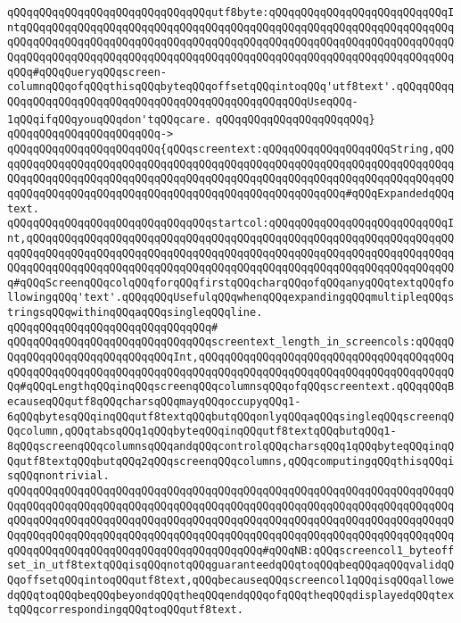 \verb|qQQqqQQqqQQqqQQqqQQqqQQqqQQqqQQqutf8byte:qQQqqQQqqQQqqQQqqQQqqQQqqQQqIntqQQqqQQqqQQqqQQqqQQqqQQqqQQqqQQqqQQqqQQqqQQqqQQqqQQqqQQqqQQqqQQqqQQqqQQqqQQqqQQqqQQqqQQqqQQqqQQqqQQqqQQqqQQqqQQqqQQqqQQqqQQqqQQqqQQqqQQqqQQqqQQqqQQqqQQqqQQqqQQqqQQqqQQqqQQqqQQqqQQqqQQqqQQqqQQqqQQqqQQqqQQqqQQqqQQq#qQQqQueryqQQqscreen-columnqQQqofqQQqthisqQQqbyteqQQqoffsetqQQqintoqQQq'utf8text'.qQQqqQQqqQQqqQQqqQQqqQQqqQQqqQQqqQQqqQQqqQQqqQQqqQQqqQQqUseqQQq-1qQQqifqQQqyouqQQqdon'tqQQqcare.|\newline
\verb|qQQqqQQqqQQqqQQqqQQqqQQq}|\newline
\verb|qQQqqQQqqQQqqQQqqQQqqQQq->|\newline
\verb|qQQqqQQqqQQqqQQqqQQqqQQq{qQQqscreentext:qQQqqQQqqQQqqQQqqQQqString,qQQqqQQqqQQqqQQqqQQqqQQqqQQqqQQqqQQqqQQqqQQqqQQqqQQqqQQqqQQqqQQqqQQqqQQqqQQqqQQqqQQqqQQqqQQqqQQqqQQqqQQqqQQqqQQqqQQqqQQqqQQqqQQqqQQqqQQqqQQqqQQqqQQqqQQqqQQqqQQqqQQqqQQqqQQqqQQqqQQqqQQqqQQqqQQqqQQq#qQQqExpandedqQQqtext.|\newline
\verb|qQQqqQQqqQQqqQQqqQQqqQQqqQQqqQQqstartcol:qQQqqQQqqQQqqQQqqQQqqQQqqQQqInt,qQQqqQQqqQQqqQQqqQQqqQQqqQQqqQQqqQQqqQQqqQQqqQQqqQQqqQQqqQQqqQQqqQQqqQQqqQQqqQQqqQQqqQQqqQQqqQQqqQQqqQQqqQQqqQQqqQQqqQQqqQQqqQQqqQQqqQQqqQQqqQQqqQQqqQQqqQQqqQQqqQQqqQQqqQQqqQQqqQQqqQQqqQQqqQQqqQQqqQQqqQQqqQQq#qQQqScreenqQQqcolqQQqforqQQqfirstqQQqcharqQQqofqQQqanyqQQqtextqQQqfollowingqQQq'text'.qQQqqQQqUsefulqQQqwhenqQQqexpandingqQQqmultipleqQQqstringsqQQqwithinqQQqaqQQqsingleqQQqline.|\newline
\verb|qQQqqQQqqQQqqQQqqQQqqQQqqQQqqQQq#|\newline
\verb|qQQqqQQqqQQqqQQqqQQqqQQqqQQqqQQqscreentext_length_in_screencols:qQQqqQQqqQQqqQQqqQQqqQQqqQQqqQQqInt,qQQqqQQqqQQqqQQqqQQqqQQqqQQqqQQqqQQqqQQqqQQqqQQqqQQqqQQqqQQqqQQqqQQqqQQqqQQqqQQqqQQqqQQqqQQqqQQqqQQqqQQqqQQqqQQq#qQQqLengthqQQqinqQQqscreenqQQqcolumnsqQQqofqQQqscreentext.qQQqqQQqBecauseqQQqutf8qQQqcharsqQQqmayqQQqoccupyqQQq1-6qQQqbytesqQQqinqQQqutf8textqQQqbutqQQqonlyqQQqaqQQqsingleqQQqscreenqQQqcolumn,qQQqtabsqQQq1qQQqbyteqQQqinqQQqutf8textqQQqbutqQQq1-8qQQqscreenqQQqcolumnsqQQqandqQQqcontrolqQQqcharsqQQq1qQQqbyteqQQqinqQQqutf8textqQQqbutqQQq2qQQqscreenqQQqcolumns,qQQqcomputingqQQqthisqQQqisqQQqnontrivial.|\newline
\newline
\verb|qQQqqQQqqQQqqQQqqQQqqQQqqQQqqQQqqQQqqQQqqQQqqQQqqQQqqQQqqQQqqQQqqQQqqQQqqQQqqQQqqQQqqQQqqQQqqQQqqQQqqQQqqQQqqQQqqQQqqQQqqQQqqQQqqQQqqQQqqQQqqQQqqQQqqQQqqQQqqQQqqQQqqQQqqQQqqQQqqQQqqQQqqQQqqQQqqQQqqQQqqQQqqQQqqQQqqQQqqQQqqQQqqQQqqQQqqQQqqQQqqQQqqQQqqQQqqQQqqQQqqQQqqQQqqQQqqQQqqQQqqQQqqQQqqQQqqQQqqQQqqQQqqQQqqQQqqQQqqQQq#qQQqNB:qQQqscreencol1_byteoffset_in_utf8textqQQqisqQQqnotqQQqguaranteedqQQqtoqQQqbeqQQqaqQQqvalidqQQqoffsetqQQqintoqQQqutf8text,qQQqbecauseqQQqscreencol1qQQqisqQQqallowedqQQqtoqQQqbeqQQqbeyondqQQqtheqQQqendqQQqofqQQqtheqQQqdisplayedqQQqtextqQQqcorrespondingqQQqtoqQQqutf8text.|\newline
